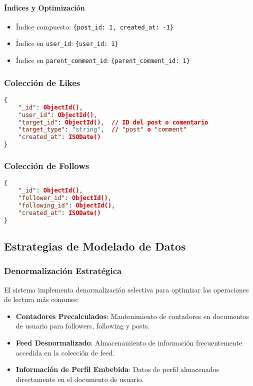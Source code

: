 \documentclass[12pt,letterpaper]{article}
\begin{document}
\paragraph{Índices y Optimización}
\begin{itemize}
    \item Índice compuesto: \texttt{\{post\_id: 1, created\_at: -1\}}
    \item Índice en \texttt{user\_id}: \texttt{\{user\_id: 1\}}
    \item Índice en \texttt{parent\_comment\_id}: \texttt{\{parent\_comment\_id: 1\}}
\end{itemize}

\subsubsection{Colección de Likes}
\begin{lstlisting}[language=json]
{
    "_id": ObjectId(),
    "user_id": ObjectId(),
    "target_id": ObjectId(),  // ID del post o comentario
    "target_type": "string",  // "post" o "comment"
    "created_at": ISODate()
}
\end{lstlisting}

\subsubsection{Colección de Follows}
\begin{lstlisting}[language=json]
{
    "_id": ObjectId(),
    "follower_id": ObjectId(),
    "following_id": ObjectId(),
    "created_at": ISODate()
}
\end{lstlisting}

\subsection{Estrategias de Modelado de Datos}

\subsubsection{Denormalización Estratégica}
El sistema implementa denormalización selectiva para optimizar las operaciones de lectura más comunes:

\begin{itemize}
    \item \textbf{Contadores Precalculados}: Mantenimiento de contadores en documentos de usuario para followers, following y posts.
    \item \textbf{Feed Desnormalizado}: Almacenamiento de información frecuentemente accedida en la colección de feed.
    \item \textbf{Información de Perfil Embebida}: Datos de perfil almacenados directamente en el documento de usuario.
\end{itemize}
\end{document}
